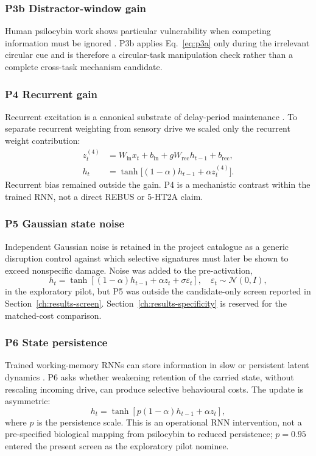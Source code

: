 \subsubsection{P3b Distractor-window gain}
Human psilocybin work shows particular vulnerability when competing information
must be ignored \cite{carter2005}. P3b applies Eq.~\eqref{eq:p3a} only during
the irrelevant circular cue and is therefore a circular-task manipulation
check rather than a complete cross-task mechanism candidate.

\subsubsection{P4 Recurrent gain}
Recurrent excitation is a canonical substrate of delay-period maintenance
\cite{wang2013nmda}. To separate recurrent weighting from sensory drive we
scaled only the recurrent weight contribution:
\begin{equation}
\begin{aligned}
 z_t^{(4)} &=
 W_{\mathrm{in}}x_t+b_{\mathrm{in}}
 +g W_{\mathrm{rec}}h_{t-1}+b_{\mathrm{rec}},\\
 h_t &= \tanh\bigl[(1-\alpha)h_{t-1}+\alpha z_t^{(4)}\bigr].
\end{aligned}
 \label{eq:p4}
\end{equation}
Recurrent bias remained outside the gain. P4 is a mechanistic contrast within
the trained RNN, not a direct REBUS or 5-HT2A claim.

\subsubsection{P5 Gaussian state noise}
Independent Gaussian noise is retained in the project catalogue as a generic
disruption control against which selective signatures must later be shown to
exceed nonspecific damage. Noise was added to the pre-activation,
\begin{equation}
 h_t=\tanh\!\left[
 (1-\alpha)h_{t-1}+\alpha z_t+\sigma\varepsilon_t
 \right],
 \quad \varepsilon_t\sim\mathcal{N}(0,I),
 \label{eq:p5}
\end{equation}
in the exploratory pilot, but P5 was outside the candidate-only screen reported
in Section~\ref{ch:results-screen}. Section~\ref{ch:results-specificity} is
reserved for the matched-cost comparison.

\subsubsection{P6 State persistence}
Trained working-memory RNNs can store information in slow or persistent latent
dynamics \cite{ghazizadeh2021,wang2013nmda}. P6 asks whether weakening
retention of the carried state, without rescaling incoming drive, can produce
selective behavioural costs. The update is asymmetric:
\begin{equation}
 h_t=\tanh\!\left[p(1-\alpha)h_{t-1}+\alpha z_t\right],
 \label{eq:persistence}
\end{equation}
where $p$ is the persistence scale. This is an operational RNN intervention,
not a pre-specified biological mapping from psilocybin to reduced persistence;
$p=0.95$ entered the present screen as the exploratory pilot nominee.

